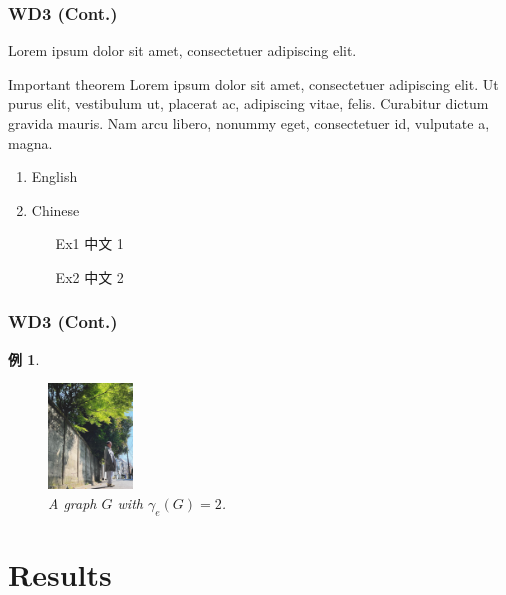 \documentclass[11pt, fontset=windows, ignorenonframetext]{beamer}  %
\newtheorem{Cexample}{例} %
\numberwithin{subsection}{section}
\numberwithin{theorem}{subsection}
\begin{document}
\begin{frame}
	\frametitle{WD3 (Cont.)}
	\justifying %
	Lorem ipsum dolor sit amet, consectetuer adipiscing elit.

	\begin{alertblock}{Important theorem}
		\justifying %
		Lorem ipsum dolor sit amet, consectetuer adipiscing elit. Ut purus elit, vestibulum ut, placerat ac, adipiscing vitae, felis. Curabitur dictum gravida mauris. Nam arcu libero, nonummy eget, consectetuer id, vulputate a, magna.
	\end{alertblock}

	\begin{enumerate}
		\item English
		\item Chinese
		\begin{itemize}
			\item[Ex1] 中文 1
			\item[Ex2] 中文 2
		\end{itemize}
	\end{enumerate}

\end{frame}

\begin{frame}
	\frametitle{WD3 (Cont.)}
	\begin{Cexample}
	\justifying
		\begin{figure}[ht]
			\centering
			\includegraphics[width=0.2\textwidth, height=0.3\textheight]{./Figure/arata_2.jpg}
			\captionsetup{justification=centering}
			\caption{A graph $G$ with $\gamma_{e}(G)=2$.\label{edom}}
		\end{figure}
	\end{Cexample}
\end{frame}

\section{Results}
\end{document}
